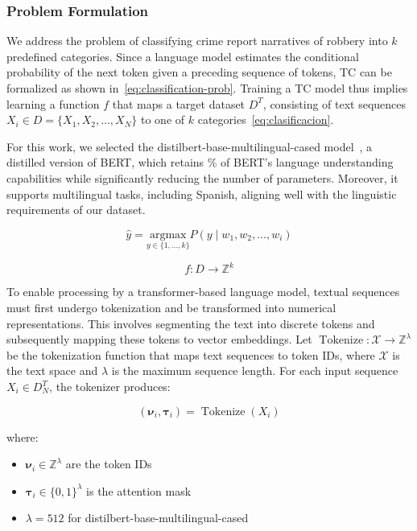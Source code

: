 \documentclass[runningheads]{llncs}
\newcommand{\modelohuggingface}{distilbert-base-multilingual-cased}
\DeclareMathOperator{\Tokenize}{Tokenize}
\begin{document}
\subsubsection{Problem Formulation}

We address the problem of classifying crime report narratives of
robbery into $k$ predefined categories. Since a language model
estimates the conditional probability of the next token given a
preceding sequence of tokens, TC can be formalized as shown
in~\eqref{eq:classification-prob}. Training a TC model thus implies
learning a function $f$ that maps a target dataset $D^T$, consisting
of text sequences $X_i \in D = \{X_1, X_2, \dots, X_N\}$ to one of $k$
categories~\eqref{eq:clasificacion}.

For this work, we selected the \modelohuggingface
model~\cite{Sanh2019DistilBERTAD}, a distilled version of BERT, which
retains \% of BERT's language understanding capabilities while
significantly reducing the number of parameters. Moreover, it supports
multilingual tasks, including Spanish, aligning well with the
linguistic requirements of our dataset.

\begin{equation}
  \label{eq:classification-prob}
  \hat{y} = \underset{y\in\{1,\dots, k\}}{\text{argmax}}P(y\mid w_1,w_2,\dots, w_i)
\end{equation}


\begin{equation}\label{eq:clasificacion}
  f: D \longrightarrow \mathbb{Z}^k
\end{equation}

To enable processing by a transformer-based language model, textual
sequences must first undergo tokenization and be transformed into
numerical representations. This involves segmenting the text into
discrete tokens and subsequently mapping these tokens to vector
embeddings. Let
$\Tokenize: \mathcal{X} \rightarrow \mathbb{Z}^\lambda$ be the
tokenization function that maps text sequences to token IDs, where
$\mathcal{X}$ is the text space and $\lambda$ is the maximum sequence
length. For each input sequence $X_i \in D^T_N$, the tokenizer
produces:

\begin{equation}\label{eq:tokenization}
    (\boldsymbol{\nu}_i, \boldsymbol{\tau}_i) = \Tokenize(X_i)
\end{equation}

where:
\begin{itemize}
    \item $\boldsymbol{\nu}_i \in \mathbb{Z}^\lambda$ are the token IDs
    \item $\boldsymbol{\tau}_i \in \{0,1\}^\lambda$ is the attention
      mask
    \item $\lambda = 512$ for \modelohuggingface

\end{itemize}
\end{document}
